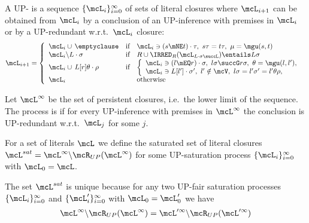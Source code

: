 \begin{definition}
    A UP- is
    a sequence \( \{ \mcL_i \}_{i=0}^\infty \)
    of sets of literal closures where
    \( \mcL_{i+1} \) can be obtained from
    \( \mcL_i \)
    by  a conclusion of an UP-inference with premises in \( \mcL_i \)
    or by  a UP-redundant w.r.t.~\(\mcL_i\) closure:
    \begin{gather*}
        \mcL_{i+1} = \left\{
            \begin{array}{lclc}
                \mcL_i \cup\,\emptyclause
                &\text{if}
                &
                    \mcL_i\ni(s\mNE t)\cdot\tau,\ {}
                    s\tau = t\tau,\ {}
                    \mu=\mgu(s,t)
                \\
                \mcL_i \backslash L\cdot\sigma
                &\text{if}
                &R \cup \IRRED_R(\mcL_{L\cdot\sigma\succL}) \entails L\sigma
                \\
                \mcL_i \cup\, L[r]\theta\cdot\rho
                &\text{if}
                &\left\{\begin{array}{l}
                    \mcL_i\ni(l\mEQ r)\cdot\sigma,\ {}
                    l\sigma\succG r\sigma,\ {}
                    \theta=\mgu(l,l'),
                    \\
                    \mcL_i\ni L[l']\cdot\sigma',\ {}
                    l'\notin\mcV,\ {}
                    l\sigma = l'\sigma' = l'\theta\rho,
                \end{array}\right.
                \\
                \mcL_i
                &&\text{otherwise}
            \end{array}
        \right.
    \end{gather*}

    Let \( \mcL^\infty \) be the set of persistent closures,
    i.e.~the lower limit of the sequence.
    The process is  if for every UP-inference
    with premises in \( \mcL^\infty \) the conclusion is UP-redundant
    w.r.t.~\(\mcL_j\) for some \(j\).

    For a set of literals \( \mcL \) we define
    the saturated set of literal closures
    \( \mcL^{sat} = \mcL^\infty\backslash\mcR_{UP}(\mcL^\infty) \)
    for some UP-saturation process
    \( \{ \mcL_i\}_{i=0}^\infty \)
    with \( \mcL_0 = \mcL \).
\end{definition}

\begin{lemma}
    The set \( \mcL^{sat} \) is unique because
    for any two UP-fair saturation processes
    \(\{ \mcL_i
        \}_{i=0}^\infty\) and
        \(\{ \mcL'_i
        \}_{i=0}^\infty\)
        with \( \mcL_0 = \mcL'_0 \) we have
        \begin{gather*}
            \mcL^\infty \backslash \mcR_{UP}(\mcL^\infty)
            =
            \mcL'^\infty \backslash \mcR_{UP}(\mcL'^\infty)
        \end{gather*}
\end{lemma}

